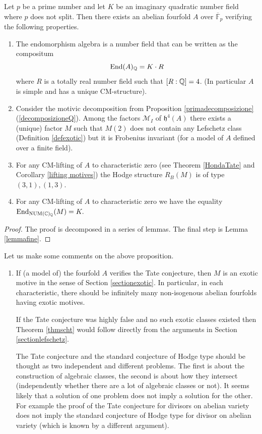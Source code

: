 \documentclass[11pt]{amsart}
\begin{document}
\begin{appendices}
\begin{proposition}\label{propexemple}
Let $p$ be a prime number and  let $K$ be an  imaginary quadratic number field where $p$ does not split. Then there exists an abelian fourfold $A$ over $\overline{\mathbb{F}}_p$ verifying the following properties.
\begin{enumerate}
\item The endomorphism  algebra is a number field that can be written as the compositum \[\textnormal{End} (A)_{\mathbb{Q}} = K \cdot R\] where $R$ is a totally real number field such that $[R:\mathbb{Q}]=4$.
(In particular $A$ is simple and has a unique CM-structure).
\item Consider the motivic decomposition from Proposition \ref{primadecomposizione}(\ref{decomposizioneQ}). Among the factors $\mathcal{M}_I$ of $\mathfrak{h}^4(A)$ there exists a (unique) factor $M$  such that $M(2)$ does not contain any Lefschetz class (Definition \ref{defexotic}) but it is Frobenius invariant (for a model of $A$ defined over a finite field).
\item\label{cond2} For any CM-lifting  of $A$ to characteristic zero (see Theorem \ref{HondaTate} and Corollary \ref{lifting motives}) the Hodge structure $R_B(M)$ is of type $(3,1),(1,3)$.
\item\label{cond1} For any CM-lifting  of $A$ to characteristic zero we have the equality $\textnormal{End}_{\mathrm{NUM}(\mathbb{C})_{\mathbb{Q}}}  (M) = K.$ 
\end{enumerate}
\end{proposition}
\begin{proof}
The proof is decomposed in a series of lemmas. The final step is Lemma \ref{lemmafine}.
\end{proof}
\begin{remark}\label{bellaciao} Let us make some comments on the above proposition.
\begin{enumerate}
\item If (a model of) the fourfold $A$ verifies the Tate conjecture, then $M$ is an exotic motive in the sense of Section \ref{sectionexotic}. In particular, in each characteristic, there should be infinitely  many non-isogenous abelian fourfolds having exotic motives. 

If the Tate conjecture was highly false and no such exotic classes existed then Theorem \ref{thmscht} would follow directly from the arguments in Section \ref{sectionlefschetz}.

The Tate conjecture and the standard conjecture of Hodge type   should be thought as two independent and different  problems. The first is about the construction of algebraic classes, the second is about how they intersect (independently whether there are a lot of algebraic classes or not). It seems likely that a solution of one problem does not imply a solution for the other. For example the proof of the Tate conjecture for divisors on abelian variety  \cite[Theorem 4]{Tate} does not imply the standard conjecture of Hodge type for divisor on abelian variety (which is known by a different argument).



\end{enumerate}
\end{remark}
\end{appendices}
\end{document}
